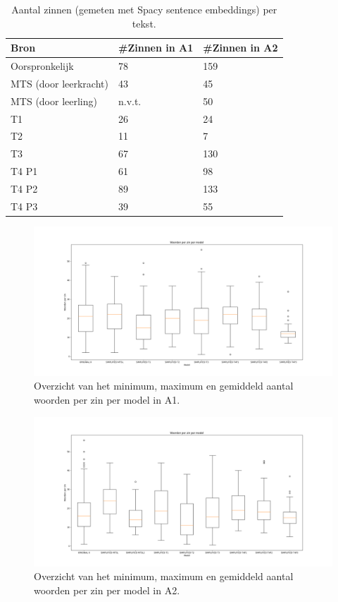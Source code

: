 \begin{table}[h]
	\centering
	\begin{tabular}{ | m{3cm} | m{3cm} | m{3cm} | } 
		\hline
		\textbf{Bron} & \textbf{#Zinnen in A1} & \textbf{#Zinnen in A2} \\
		\hline
		Oorspronkelijk & 78  & 159 \\ 
		\hline
		MTS (door leerkracht) & 43 & 45 \\
		\hline
		MTS (door leerling) & n.v.t. & 50 \\
		\hline
		T1 & 26 & 24 \\
		\hline
		T2 & 11 & 7 \\
		\hline
		T3 & 67 & 130 \\
		\hline
		T4 P1 & 61 & 98 \\
		\hline
		T4 P2 & 89 & 133 \\
		\hline
		T4 P3 & 39 & 55 \\
		\hline
	\end{tabular}
	\caption{Aantal zinnen (gemeten met Spacy sentence embeddings) per tekst.}
	\label{table:resultaten-aantal-zinnen}
\end{table}

\begin{figure}[H]
	\includegraphics[width=\linewidth]{img/boxplot-avg-a1.png}
	\caption{Overzicht van het minimum, maximum en gemiddeld aantal woorden per zin per model in A1.}
	\label{img:boxplot-min-max-avg-words-a1}
\end{figure}

\begin{figure}[H]
	\includegraphics[width=\linewidth]{img/boxplot-avg-a2.png}
	\caption{Overzicht van het minimum, maximum en gemiddeld aantal woorden per zin per model in A2.}
	\label{img:boxplot-min-max-avg-words-a2}
\end{figure}

